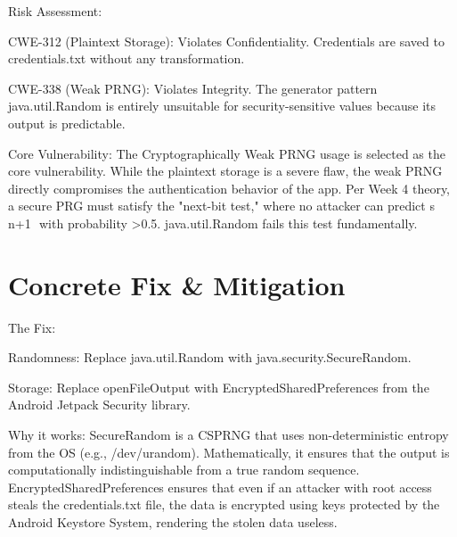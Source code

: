 Risk Assessment:

CWE-312 (Plaintext Storage): Violates Confidentiality. Credentials are saved to credentials.txt without any transformation.

CWE-338 (Weak PRNG): Violates Integrity. The generator pattern java.util.Random is entirely unsuitable for security-sensitive values because its output is predictable.

Core Vulnerability:
The Cryptographically Weak PRNG usage is selected as the core vulnerability. While the plaintext storage is a severe flaw, the weak PRNG directly compromises the authentication behavior of the app. Per Week 4 theory, a secure PRG must satisfy the "next-bit test," where no attacker can predict s 
n+1
​	
  with probability >0.5. java.util.Random fails this test fundamentally.

\section{Concrete Fix \& Mitigation}

The Fix:

Randomness: Replace java.util.Random with java.security.SecureRandom.

Storage: Replace openFileOutput with EncryptedSharedPreferences from the Android Jetpack Security library.

Why it works:
SecureRandom is a CSPRNG that uses non-deterministic entropy from the OS (e.g., /dev/urandom). Mathematically, it ensures that the output is computationally indistinguishable from a true random sequence. EncryptedSharedPreferences ensures that even if an attacker with root access steals the credentials.txt file, the data is encrypted using keys protected by the Android Keystore System, rendering the stolen data useless.






